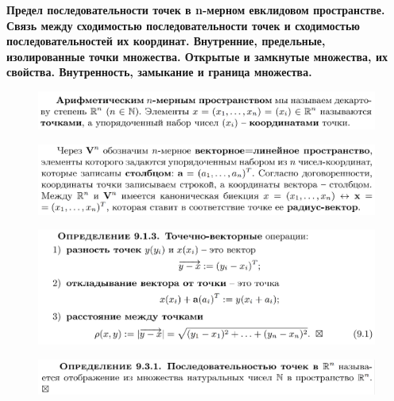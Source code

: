 \documentclass{article}
\date{}
\begin{document}
\noindent
\textbf{Предел последовательности точек в n-мерном евклидовом пространстве. Связь между сходимостью последовательности точек и сходимостью последовательностей их координат. Внутренние, предельные, изолированные точки множества. Открытые и замкнутые множества, их свойства. Внутренность, замыкание и граница множества.}

\begin{figure}[h!]
    \centering
    \includegraphics[width=\textwidth]{1.png}
    \vspace{-1cm}
\end{figure}
\begin{figure}[h!]
    \centering
    \includegraphics[width=\textwidth]{12.png}
    \vspace{-1cm}
\end{figure}
\begin{figure}[h!]
    \centering
    \includegraphics[width=\textwidth]{11.png}
    \vspace{-1cm}
\end{figure}
\begin{figure}[h!]
    \centering
    \includegraphics[width=\textwidth]{2.png}
    \vspace{-1cm}
\end{figure}
\begin{figure}[h!]
    \centering
    \vspace{-1cm}
\end{figure}
\end{document}
